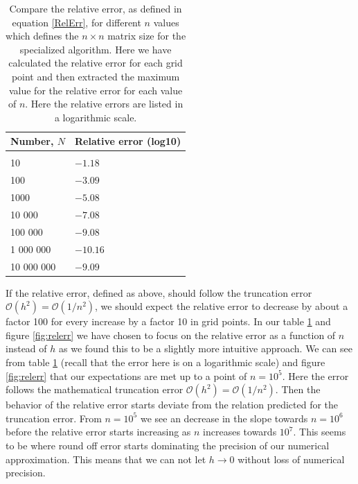\documentclass[12pt]{article}
\numberwithin{figure}{section}
\numberwithin{table}{section}
\begin{document}
\begin{table}[ht]
\begin{center}
\label{RelativErr}
  \begin{tabular}{| l | l |}
  \hline
    Number, $N$ &  Relative error (log10)  \\[0.10cm]\hline \hline
     & \\
     10 & $  -1.18  $  \\[0.10cm]
     100 & $  -3.09 $  \\[0.10cm]
     1000 & $  -5.08 $ \\[0.10cm]
     10 000 & $ -7.08  $ \\[0.10cm]
     100 000 & $ -9.08  $ \\[0.10cm]
     1 000 000 & $  -10.16  $ \\[0.10cm]
     10 000 000 & $ -9.09	$			\\[0.1cm]
     \hline
  \end{tabular}
\end{center}
\caption{Compare the relative error, as defined in equation \eqref{RelErr}, for different $n$ values which defines the $n \times n$ matrix size for the specialized algorithm. Here we have calculated the relative error for each grid point and then extracted the maximum value for the relative error for each value of $n$. Here the relative errors are listed in a logarithmic scale.}
\end{table}

\noindent If the relative error, defined as above, should follow the truncation error $\mathcal{O}(h^2)=\mathcal{O}(1/n^2)$, we should expect the relative error to decrease by about a factor 100 for every increase by a factor 10 in grid points. In our table \ref{RelativErr} and figure \ref{fig:relerr} we have chosen to focus on the relative error as a function of $n$ instead of $h$ as we found this to be a slightly more intuitive approach. We can see from table \ref{RelativErr} (recall that the error here is on a logarithmic scale) and figure \ref{fig:relerr} that our expectations are met up to a point of $n=10^5$. Here the error follows the mathematical truncation error $\mathcal{O}(h^2)=\mathcal{O}(1/n^2)$. Then the behavior of the relative error starts deviate from the relation predicted for the truncation error. From $n=10^5$ we see an decrease in the slope towards $n=10^6$ before the relative error starts increasing as $n$ increases towards $10^7$. This seems to be where round off error starts dominating the precision of our numerical approximation. This means that we can not let $h \to 0$ without loss of numerical precision.  \\
\end{document}
